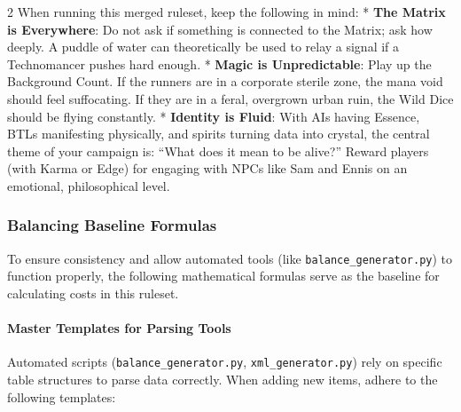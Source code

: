 \documentclass[
  oneside]{article}
\begin{document}
\begin{multicols}{2}
When running this merged ruleset, keep the
following in mind: * \textbf{The Matrix is
Everywhere}: Do not ask if something is connected
to the Matrix; ask how deeply. A puddle of water
can theoretically be used to relay a signal if a
Technomancer pushes hard enough. * \textbf{Magic
is Unpredictable}: Play up the Background Count.
If the runners are in a corporate sterile zone,
the mana void should feel suffocating. If they are
in a feral, overgrown urban ruin, the Wild Dice
should be flying constantly. * \textbf{Identity is
Fluid}: With AIs having Essence, BTLs manifesting
physically, and spirits turning data into crystal,
the central theme of your campaign is: ``What does
it mean to be alive?'' Reward players (with Karma
or Edge) for engaging with NPCs like Sam and Ennis
on an emotional, philosophical level.

\hypertarget{balancing-baseline-formulas}{%
\subsubsection{Balancing Baseline
Formulas}\label{balancing-baseline-formulas}}

To ensure consistency and allow automated tools
(like \texttt{balance\_generator.py}) to function
properly, the following mathematical formulas
serve as the baseline for calculating costs in
this ruleset.

\hypertarget{master-templates-for-parsing-tools}{%
\paragraph{Master Templates for Parsing
Tools}\label{master-templates-for-parsing-tools}}

Automated scripts (\texttt{balance\_generator.py},
\texttt{xml\_generator.py}) rely on specific table
structures to parse data correctly. When adding
new items, adhere to the following templates:


\end{multicols}
\end{document}
